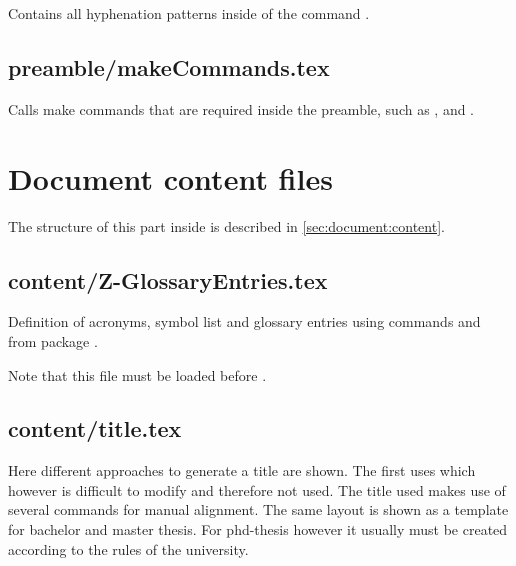 Contains all hyphenation patterns inside of the command .


\section{preamble/makeCommands.tex}

Calls make commands that are required inside the preamble, such as 
,  and .


\chapter{Document content files}

The structure of this part inside  is described in  \vref{sec:document:content}.

\section{content/Z-GlossaryEntries.tex}

Definition of acronyms, symbol list and glossary entries using commands   and  from package .

Note that this file must be loaded before .


\section{content/title.tex}

Here different approaches to generate a title are shown. The first uses  which however is difficult to modify and therefore not used. The title used makes use of several  commands for manual alignment. The same layout is shown as a template for bachelor and master thesis. For phd-thesis however it usually must be created according to the rules of the university.

